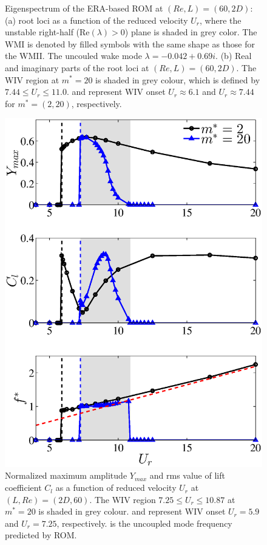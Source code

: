 \begin{figure}
\begin{subfigure}{0.495\textwidth}
    \caption{}
    \label{•}
    \end{subfigure} 
  \caption{Eigenspectrum of the ERA-based ROM at $(Re,L)=(60,2D)$: 
     (a) root loci as a function of the reduced velocity $U_r$, 
     where the unstable right-half (Re$(\lambda) > 0$) plane is shaded in grey color.
     The WMI is denoted by filled symbols with the same shape as those for the WMII. 
     The uncouled wake mode $\lambda=-0.042+0.69i$.
     (b) Real and imaginary parts of the root loci at $(Re,L)=(60,2D)$.
     The WIV region at $m^*=20$ is shaded in grey colour, which is defined by 
     $7.44 \le U_{r} \le 11.0$.
     {\protect\reddash} and {\protect\bluedash} represent WIV onset $U_r \approx 6.1$ 
      and $U_r \approx 7.44$ for $m^*=(2,20)$, respectively.}
\label{fig:ld2_eig}  
\end{figure}



\begin{figure}
	 \centering
	 \includegraphics[scale=0.45]{fom_circle_m2_20}
     \caption{Normalized maximum amplitude $Y_{max}$ and 
        rms value of lift coefficient $C_l$
         as a function of reduced velocity $U_r$ at $(L,Re)=(2D,60)$. 
        The WIV region $7.25 \le U_{r} \le 10.87$ at $m^*=20$ is shaded in grey colour.
        {\protect\blackdash} and {\protect\bluedash} represent WIV onset $U_r=5.9$ 
        and $U_r=7.25$, respectively. {\protect\reddash} is the uncoupled mode frequency predicted by ROM.}
\label{fig:fom_2_ycl}
\end{figure}



